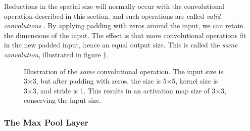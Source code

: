     
    Reductions in the spatial size will normally occur with the convolutional operation described in this section, and such operations are called \textit{valid convolutions} \cite{o2015introduction_convolutions}. By applying padding with zeros around the input, we can retain the dimensions of the input. The effect is that more convolutional operations fit in the new padded input, hence an equal output size. This is called the \textit{same convolution}, illustrated in figure \ref{same_convolutional_fig}.
    
    \begin{figure}[H]
        \centering
        
        \caption[Same convolution example]{Illustration of the \textit{same} convolutional operation. The input size is 3×3, but after padding with zeros, the size is 5×5, kernel size is 3×3, and stride is 1. This results in an activation map size of 3×3, conserving the input size.}
      	\medskip 
        \label{same_convolutional_fig}
    \end{figure}
    

    
\subsubsection{The Max Pool Layer}

